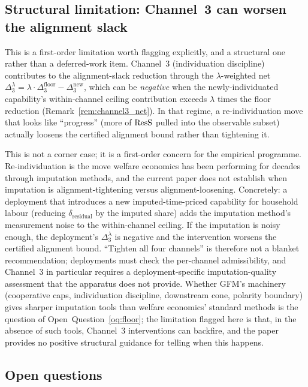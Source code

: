 \subsection{Structural limitation: Channel~3 can worsen the alignment slack}
\label{sec:channel3_limitation}

This is a first-order limitation worth flagging explicitly, and
a structural one rather than a deferred-work item.  Channel~3
(individuation discipline) contributes to the alignment-slack
reduction through the $\lambda$-weighted net
$\Delta_3^{\lambda} = \lambda \cdot \Delta_3^{\mathrm{floor}}
- \Delta_3^{\mathrm{new}}$, which can be \emph{negative} when
the newly-individuated capability's within-channel ceiling
contribution exceeds $\lambda$ times the floor reduction
(Remark~\ref{rem:channel3_net}).  In that regime, a
re-individuation move that looks like ``progress'' (more of
$\mathrm{ResS}$ pulled into the observable subset) actually loosens the
certified alignment bound rather than tightening it.

This is not a corner case; it is a first-order concern for the
empirical programme.  Re-individuation is the move welfare
economics has been performing for decades through imputation
methods, and the current paper does not establish when
imputation is alignment-tightening versus alignment-loosening.
Concretely: a deployment that introduces a new
imputed-time-priced capability for household labour (reducing
$\delta_{\mathrm{residual}}$ by the imputed share) adds the
imputation method's measurement noise to the within-channel
ceiling.  If the imputation is noisy enough, the deployment's
$\Delta_3^{\lambda}$ is negative and the intervention worsens
the certified alignment bound.  ``Tighten all four channels''
is therefore not a blanket recommendation; deployments must
check the per-channel admissibility, and Channel~3 in
particular requires a deployment-specific imputation-quality
assessment that the apparatus does not provide.  Whether GFM's
machinery (cooperative caps, individuation discipline,
downstream cone, polarity boundary) gives sharper imputation
tools than welfare economics' standard methods is the question
of Open~Question~\ref{oq:floor}; the limitation flagged here is
that, in the absence of such tools, Channel~3 interventions
can backfire, and the paper provides no positive structural
guidance for telling when this happens.

\subsection{Open questions}
\label{sec:open_questions}

